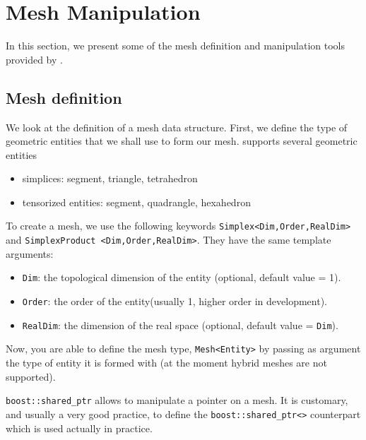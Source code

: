 \section{Mesh Manipulation}
\label{sec:mesh-manipulation}


In this section, we present some of the mesh definition and
manipulation tools provided by \feel.

\subsection{Mesh definition}

We look at the definition of a mesh data structure. First, we define
the type of geometric entities that we shall use to form our mesh. \feel supports several geometric entities 
\begin{itemize}
\item simplices: segment, triangle, tetrahedron
\item tensorized entities: segment, quadrangle, hexahedron
\end{itemize}

To create a mesh, we use the following keywords \lstinline!Simplex<Dim,Order,RealDim>!  and \newline
\lstinline!SimplexProduct <Dim,Order,RealDim>!. They have the same
template arguments:
\begin{itemize}
\item \lstinline!Dim!: the topological dimension of the entity (optional, default value = 1).
\item \lstinline!Order!: the order of the entity(usually 1, higher order in development).
\item \lstinline!RealDim!: the dimension of the real space (optional, default value = \lstinline!Dim!).
\end{itemize}




Now, you are able to define the mesh type, \lstinline!Mesh<Entity>! by passing as
argument the type of entity it is formed with (at the moment hybrid
meshes are not supported).



\lstinline!boost::shared_ptr! allows to manipulate a pointer on a mesh. It is customary, and usually a very good practice, to define the
\lstinline!boost::shared_ptr<>!  counterpart which is used actually in practice. 

